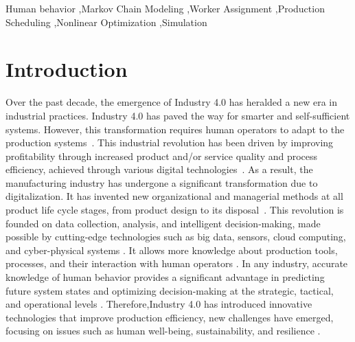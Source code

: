 \documentclass[review,12pt, 3p, times]{elsarticle}
\begin{document}
\begin{frontmatter}
\begin{keyword} 
Human behavior \sep Markov Chain Modeling \sep Worker Assignment   \sep Production Scheduling \sep Nonlinear Optimization \sep Simulation 


\end{keyword}
\end{frontmatter}

\section{Introduction}
Over the past decade, the emergence of Industry 4.0 has heralded a new era in industrial practices. Industry 4.0 has paved the way for  smarter and self-sufficient  systems. However, this transformation requires human operators to adapt to the production systems~\cite{lyngstadaas2022harder,fantini2020placing,pinzone2020framework}. This industrial revolution has been driven by  improving profitability through increased product and/or service quality and process efficiency, achieved through various digital technologies~\cite{raja2023industry}. As a result, the manufacturing industry has undergone a significant transformation due to digitalization. It has invented new organizational and managerial methods at all product life cycle stages, from product design to its disposal~\citep{messaadia2016plm}. This revolution is founded on  data collection, analysis, and intelligent decision-making, made possible by  cutting-edge technologies such as big data, sensors, cloud computing, and cyber-physical systems \citep{brik2022fog}. It allows   more knowledge about production tools, processes, and their interaction with human operators \cite{kadir2020human}. In any industry, accurate knowledge of human behavior provides a significant advantage in predicting future system states and optimizing decision-making at the strategic, tactical, and operational levels \citep{bailly2020}. Therefore,Industry 4.0 has introduced innovative technologies that improve production efficiency, new challenges have emerged, focusing on issues such as human well-being, sustainability, and resilience \citep{lyngstadaas2022harder}.
\end{document}
